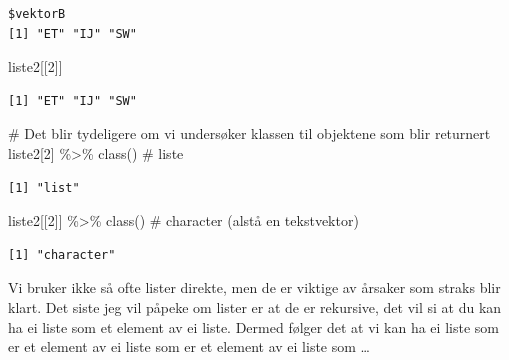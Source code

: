 \documentclass[
  letterpaper,
  DIV=11,
  numbers=noendperiod]{scrreprt}
\newenvironment{Shaded}{\begin{snugshade}}{\end{snugshade}}
\newcommand{\CommentTok}[1]{\textcolor[rgb]{0.37,0.37,0.37}{#1}}
\newcommand{\DecValTok}[1]{\textcolor[rgb]{0.68,0.00,0.00}{#1}}
\newcommand{\FunctionTok}[1]{\textcolor[rgb]{0.28,0.35,0.67}{#1}}
\newcommand{\NormalTok}[1]{\textcolor[rgb]{0.00,0.23,0.31}{#1}}
\newcommand{\SpecialCharTok}[1]{\textcolor[rgb]{0.37,0.37,0.37}{#1}}
\begin{document}
\begin{verbatim}
$vektorB
[1] "ET" "IJ" "SW"
\end{verbatim}

\begin{Shaded}
\begin{Highlighting}[]
\NormalTok{liste2[[}\DecValTok{2}\NormalTok{]]}
\end{Highlighting}
\end{Shaded}

\begin{verbatim}
[1] "ET" "IJ" "SW"
\end{verbatim}

\begin{Shaded}
\begin{Highlighting}[]
\CommentTok{\# Det blir tydeligere om vi undersøker klassen til objektene som blir returnert}
\NormalTok{liste2[}\DecValTok{2}\NormalTok{] }\SpecialCharTok{\%\textgreater{}\%} \FunctionTok{class}\NormalTok{() }\CommentTok{\# liste}
\end{Highlighting}
\end{Shaded}

\begin{verbatim}
[1] "list"
\end{verbatim}

\begin{Shaded}
\begin{Highlighting}[]
\NormalTok{liste2[[}\DecValTok{2}\NormalTok{]] }\SpecialCharTok{\%\textgreater{}\%} \FunctionTok{class}\NormalTok{() }\CommentTok{\# character (alstå en tekstvektor)}
\end{Highlighting}
\end{Shaded}

\begin{verbatim}
[1] "character"
\end{verbatim}

Vi bruker ikke så ofte lister direkte, men de er viktige av årsaker som
straks blir klart. Det siste jeg vil påpeke om lister er at de er
rekursive, det vil si at du kan ha ei liste som et element av ei liste.
Dermed følger det at vi kan ha ei liste som er et element av ei liste
som er et element av ei liste som \ldots{}
\end{document}
